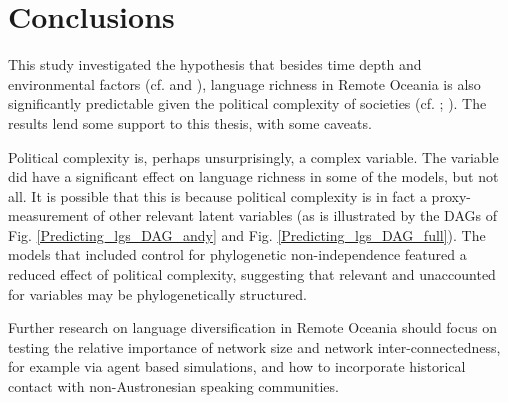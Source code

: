 \documentclass[unnumsec,webpdf,modern,medium]{oup-authoring-template}
\begin{document}
\FloatBarrier
\section{Conclusions}
This study investigated the hypothesis that besides time depth and environmental factors (cf. \citet{curriemace2009, gavin2012island, hua2019ecological} and \citet{Pacheco_Coelho_2019}), language richness in Remote Oceania is also significantly predictable given the political complexity of societies (cf. \citet{turner1884}; \citet{pawley81, pawley2007}). The results lend some support to this thesis, with some caveats. 

Political complexity is, perhaps unsurprisingly, a complex variable. The variable did have a significant effect on language richness in some of the models, but not all. It is possible that this is because political complexity is in fact a proxy-measurement of other relevant latent variables (as is illustrated by the DAGs of Fig. \ref{Predicting_lgs_DAG_andy} and Fig. \ref{Predicting_lgs_DAG_full}). The models that included control for phylogenetic non-independence featured a reduced effect of political complexity, suggesting that relevant and unaccounted for variables may be phylogenetically structured.

Further research on language diversification in Remote Oceania should focus on testing the relative importance of network size and network inter-connectedness, for example via agent based simulations, and how to incorporate historical contact with non-Austronesian speaking communities.




\end{document}

